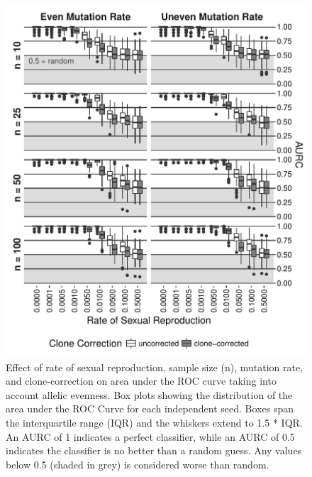 \documentclass[]{article}
\theoremstyle{definition}
\theoremstyle{definition}
\theoremstyle{remark}
\begin{document}
\begin{figure}
\centering
\includegraphics[width=1.00000\textwidth]{figure/AURC_box_plot_ea.pdf}
\caption{Effect of rate of sexual reproduction, sample size (n),
mutation rate, and clone-correction on area under the ROC curve taking
into account allelic evenness. Box plots showing the distribution of the
area under the ROC Curve for each independent seed. Boxes span the
interquartile range (IQR) and the whiskers extend to 1.5 * IQR. An AURC
of 1 indicates a perfect classifier, while an AURC of 0.5 indicates the
classifier is no better than a random guess. Any values below 0.5
(shaded in grey) is considered worse than random.}\label{fig:sim2a}
\end{figure}
\end{document}
